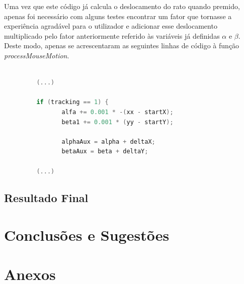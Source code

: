 \documentclass[a4paper]{article}
\begin{document}
Uma vez que este código já calcula o deslocamento do rato quando premido, apenas foi necessário com alguns testes encontrar um fator que tornasse a experiência agradável para o utilizador e adicionar esse deslocamento multiplicado pelo fator anteriormente referido às variáveis já definidas $\alpha$ e $\beta$. Deste modo, apenas se acrescentaram as seguintes linhas de código à função \textit{processMouseMotion}.

\begin{lstlisting}[language=C++, caption=Alterações na função \textit{processMouseMotion}.]
 
         (...)

         if (tracking == 1) {
                alfa += 0.001 * -(xx - startX);
                beta1 += 0.001 * (yy - startY);

                alphaAux = alpha + deltaX;
                betaAux = beta + deltaY;

         (...)

\end{lstlisting}




\subsection{Resultado Final} %



\clearpage
\section{Conclusões e Sugestões} 

\hspace{3mm} 


\newpage



\newpage
\section{Anexos}

\begin{lstlisting}[language=XML, caption=Ficheiro \emph{XML} de modelação do sistema solar.]
    
\end{lstlisting}
\end{document}
